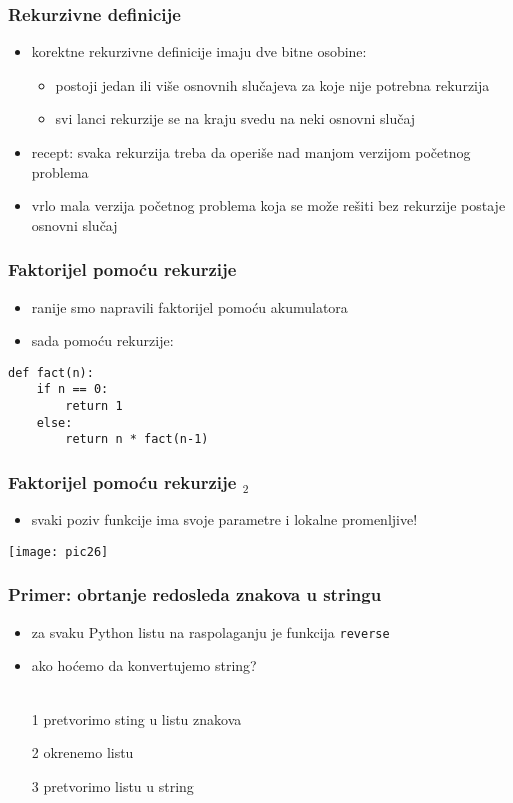\documentclass[utf8,compress,aspectratio=169]{beamer}
\begin{document}
\begin{frame}[fragile]
  \frametitle{Rekurzivne definicije}
  \begin{itemize}
    \item korektne rekurzivne definicije imaju dve bitne osobine:
    \begin{itemize}
      \item postoji jedan ili više osnovnih slučajeva za koje nije potrebna rekurzija
      \item svi lanci rekurzije se na kraju svedu na neki osnovni slučaj
    \end{itemize}
    \item recept: svaka rekurzija treba da operiše nad manjom verzijom početnog problema
    \item vrlo mala verzija početnog problema koja se može rešiti bez rekurzije postaje osnovni slučaj
  \end{itemize}
\end{frame}

\begin{frame}[fragile]
  \frametitle{Faktorijel pomoću rekurzije}
  \begin{itemize}
    \item ranije smo napravili faktorijel pomoću akumulatora
    \item sada pomoću rekurzije:
  \end{itemize}
\begin{verbatim}
def fact(n):
    if n == 0:
        return 1
    else:
        return n * fact(n-1)
\end{verbatim}
\end{frame}

\begin{frame}[fragile]
  \frametitle{Faktorijel pomoću rekurzije $_2$}
  \begin{itemize}
    \item svaki poziv funkcije ima svoje parametre i lokalne promenljive!
  \end{itemize}
  \begin{center}
    \texttt{[image: pic26]}
  \end{center}
\end{frame}

\begin{frame}[fragile]
  \frametitle{Primer: obrtanje redosleda znakova u stringu}
  \begin{itemize}
    \item za svaku Python listu na raspolaganju je funkcija \texttt{reverse}
    \item ako hoćemo da konvertujemo string? \\ \ \\
    \item[1] pretvorimo sting u listu znakova
    \item[2] okrenemo listu
    \item[3] pretvorimo listu u string
  \end{itemize}
\end{frame}
\end{document}
